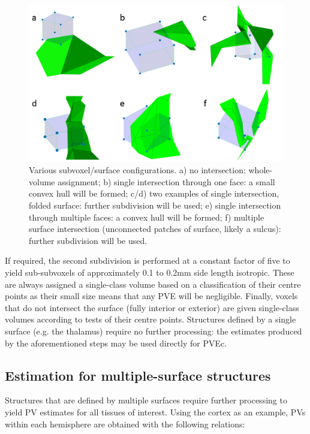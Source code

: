 \documentclass[12pt]{report}
\begin{document}
\begin{figure}
\centering
\includegraphics[width = \textwidth]{all_subvoxels.png}
\caption{Various subvoxel/surface configurations. a) no intersection: whole-volume assignment; b) single intersection through one face: a small convex hull will be formed; c/d) two examples of single intersection, folded surface: further subdivision will be used; e) single intersection through multiple faces: a convex hull will be formed; f) multiple surface intersection (unconnected patches of surface, likely a sulcus): further subdivision will be used. }
\label{all_subvoxels}
\end{figure}

If required, the second subdivision is performed at a constant factor of five to yield sub-subvoxels of approximately 0.1 to 0.2mm side length isotropic. These are always assigned a single-class volume based on a classification of their centre points as their small size means that any PVE will be negligible. Finally, voxels that do not intersect the surface (fully interior or exterior) are given single-class volumes according to tests of their centre points. Structures defined by a single surface (e.g. the thalamus) require no further processing: the estimates produced by the aforementioned steps may be used directly for PVEc.

\subsection{Estimation for multiple-surface structures}
Structures that are defined by multiple surfaces require further processing to yield PV estimates for all tissues of interest. Using the cortex as an example, PVs within each hemisphere are obtained with the following relations:
\end{document}
